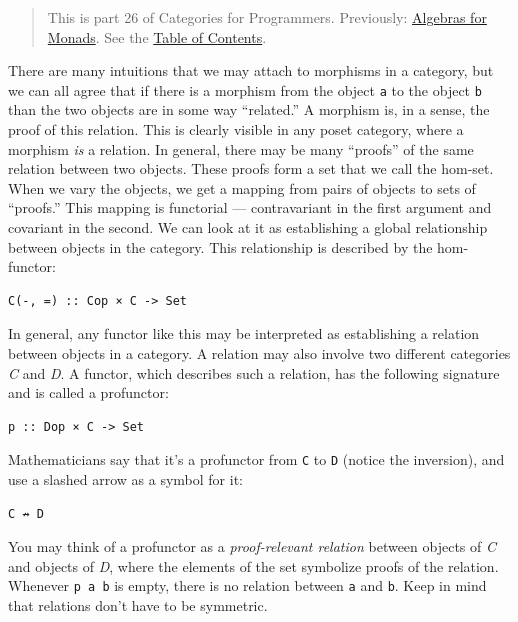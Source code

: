 \begin{quote}
This is part 26 of Categories for Programmers. Previously:
\href{https://bartoszmilewski.com/2017/03/14/algebras-for-monads/}{Algebras
for Monads}. See the
\href{https://bartoszmilewski.com/2014/10/28/category-theory-for-programmers-the-preface/}{Table
of Contents}.
\end{quote}

There are many intuitions that we may attach to morphisms in a category,
but we can all agree that if there is a morphism from the object
\texttt{a} to the object \texttt{b} than the two objects are in some way
``related.'' A morphism is, in a sense, the proof of this relation. This
is clearly visible in any poset category, where a morphism \emph{is} a
relation. In general, there may be many ``proofs'' of the same relation
between two objects. These proofs form a set that we call the hom-set.
When we vary the objects, we get a mapping from pairs of objects to sets
of ``proofs.'' This mapping is functorial --- contravariant in the first
argument and covariant in the second. We can look at it as establishing
a global relationship between objects in the category. This relationship
is described by the hom-functor:

\begin{verbatim}
C(-, =) :: Cop × C -> Set
\end{verbatim}

In general, any functor like this may be interpreted as establishing a
relation between objects in a category. A relation may also involve two
different categories \emph{C} and \emph{D}. A functor, which describes
such a relation, has the following signature and is called a profunctor:

\begin{verbatim}
p :: Dop × C -> Set
\end{verbatim}

Mathematicians say that it's a profunctor from \texttt{C} to \texttt{D}
(notice the inversion), and use a slashed arrow as a symbol for it:

\begin{verbatim}
C ↛ D
\end{verbatim}

You may think of a profunctor as a \emph{proof-relevant relation}
between objects of \emph{C} and objects of \emph{D}, where the elements
of the set symbolize proofs of the relation. Whenever \texttt{p\ a\ b}
is empty, there is no relation between \texttt{a} and \texttt{b}. Keep
in mind that relations don't have to be symmetric.

